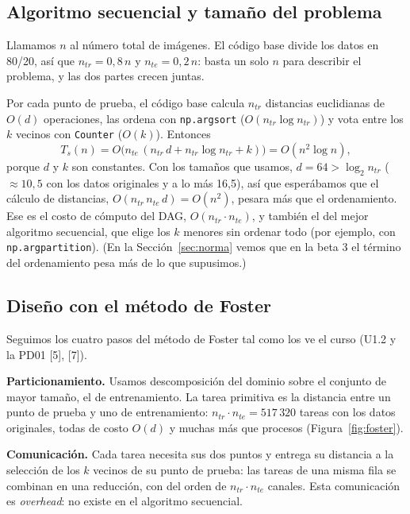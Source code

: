 \documentclass[11pt,a4paper]{article}
\newcommand{\ntr}{n_{tr}}
\newcommand{\nte}{n_{te}}
\begin{document}
\subsection{Algoritmo secuencial y tamaño del problema}
\label{sec:secuencial}

Llamamos $n$ al número total de imágenes. El código base divide los datos en 80/20, así que $\ntr = 0{,}8\,n$ y $\nte = 0{,}2\,n$: basta un solo $n$ para describir el problema, y las dos partes crecen juntas.

Por cada punto de prueba, el código base calcula $\ntr$ distancias euclidianas de $O(d)$ operaciones, las ordena con \texttt{np.argsort} ($O(\ntr\log\ntr)$) y vota entre los $k$ vecinos con \texttt{Counter} ($O(k)$). Entonces
\[
T_s(n) = O\big(\nte\,(\ntr\, d + \ntr \log \ntr + k)\big) = O(n^2 \log n),
\]
porque $d$ y $k$ son constantes. Con los tamaños que usamos, $d = 64 > \log_2 \ntr$ ($\approx 10{,}5$ con los datos originales y a lo más 16,5), así que esperábamos que el cálculo de distancias, $O(\ntr\,\nte\,d) = O(n^2)$, pesara más que el ordenamiento. Ese es el costo de cómputo del DAG, $O(\ntr\cdot\nte)$, y también el del mejor algoritmo secuencial, que elige los $k$ menores sin ordenar todo (por ejemplo, con \texttt{np.argpartition}). (En la Sección~\ref{sec:norma} vemos que en la beta 3 el término del ordenamiento pesa más de lo que supusimos.)

\subsection{Diseño con el método de Foster}
\label{sec:foster}

Seguimos los cuatro pasos del método de Foster tal como los ve el curso (U1.2 y la PD01 [5], [7]).

\textbf{Particionamiento.} Usamos descomposición del dominio sobre el conjunto de mayor tamaño, el de entrenamiento. La tarea primitiva es la distancia entre un punto de prueba y uno de entrenamiento: $\ntr\cdot\nte = 517\,320$ tareas con los datos originales, todas de costo $O(d)$ y muchas más que procesos (Figura~\ref{fig:foster}).

\textbf{Comunicación.} Cada tarea necesita sus dos puntos y entrega su distancia a la selección de los $k$ vecinos de su punto de prueba: las tareas de una misma fila se combinan en una reducción, con del orden de $\ntr\cdot\nte$ canales. Esta comunicación es \textit{overhead}: no existe en el algoritmo secuencial.
\end{document}

